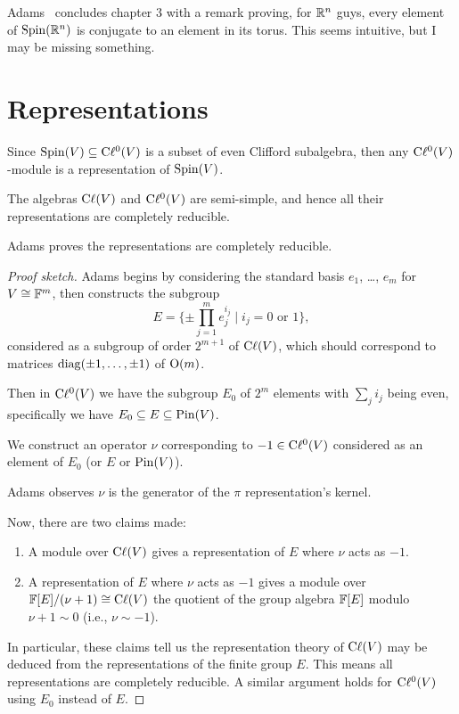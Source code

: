 \begin{remark}
Adams~\cite{adams1996:ex} concludes chapter 3 with a remark proving, for
$\mathbb{R}^{n}$ guys, every element of $\operatorname{Spin}(\mathbb{R}^{n})$ is conjugate to an
element in its torus. This seems intuitive, but I may be missing
something. 
\end{remark}

\section{Representations}

\M
Since $\operatorname{Spin}(V)\subseteq\mathrm{C}\ell^{0}(V)$ is a subset of even Clifford
subalgebra, then any $\mathrm{C}\ell^{0}(V)$-module is a representation of
$\operatorname{Spin}(V)$.

\begin{proposition}
The algebras $\mathrm{C}\ell(V)$ and $\mathrm{C}\ell^{0}(V)$ are semi-simple, and hence all
their representations are completely reducible.
\end{proposition}

Adams proves the representations are completely reducible.

\begin{proof}[Proof sketch]
Adams begins by considering the standard basis $e_{1}$, \dots, $e_{m}$
for $V\cong\mathbb{F}^{m}$, then constructs the subgroup
\begin{equation}
E = \{\pm\prod^{m}_{j=1}e^{i_{j}}_{j} \mid i_{j}=0\mbox{ or }1\},
\end{equation}
considered as a subgroup of order $2^{m+1}$ of $\mathrm{C}\ell(V)$, which should
correspond to matrices $\operatorname{diag}(\pm1,\dots,\pm1)$ of $\mathrm{O}(m)$.

Then in $\mathrm{C}\ell^{0}(V)$ we have the subgroup $E_{0}$ of $2^{m}$ elements
with $\sum_{j}i_{j}$ being even, specifically we have $E_{0}\subseteq E\subseteq\operatorname{Pin}(V)$.

We construct an operator $\nu$ corresponding to $-1\in\mathrm{C}\ell^{0}(V)$
considered as an element of $E_{0}$ (or $E$ or $\operatorname{Pin}(V)$).

Adams observes $\nu$ is the generator of the $\pi$ representation's kernel.

Now, there are two claims made:
\begin{enumerate}
\item A module over $\mathrm{C}\ell(V)$ gives a representation of $E$ where $\nu$
  acts as $-1$.
\item A representation of $E$ where $\nu$ acts as $-1$ gives a module
  over $\mathbb{F}[E]/(\nu+1)\cong\mathrm{C}\ell(V)$ the quotient of the group algebra
  $\mathbb{F}[E]$ modulo $\nu+1\sim0$ (i.e., $\nu\sim-1$).
\end{enumerate}
In particular, these claims tell us the representation theory of
$\mathrm{C}\ell(V)$ may be deduced from the representations of the finite group $E$.
This means all representations are completely reducible. A similar
argument holds for $\mathrm{C}\ell^{0}(V)$ using $E_{0}$ instead of $E$.
\end{proof}

